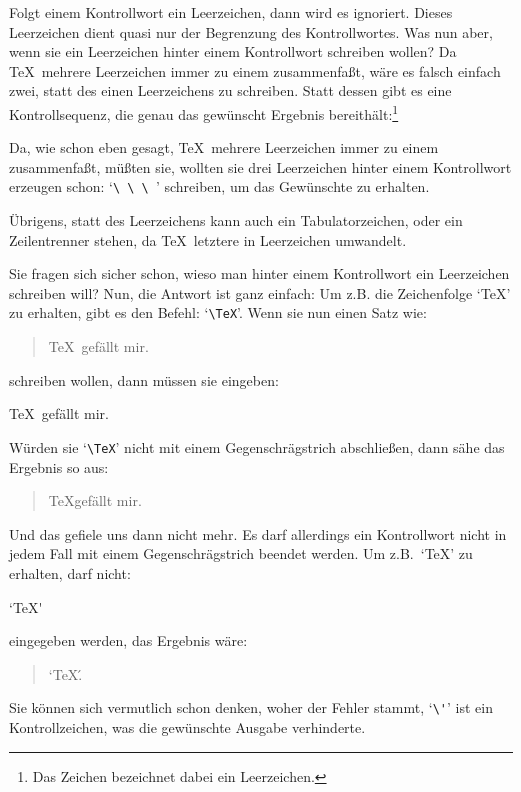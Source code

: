 Folgt einem Kontrollwort ein 
Leerzeichen, dann wird es ignoriert.
Dieses Leerzeichen dient quasi nur der Begrenzung des Kontrollwortes.
Was nun aber, wenn sie ein Leerzeichen hinter einem Kontrollwort
schreiben wollen? Da \TeX\ mehrere Leerzeichen immer zu einem
zusammenfa\ss{}t, w\"are es falsch einfach zwei, statt des einen
Leerzeichens zu schreiben. Statt dessen gibt es eine
Kontrollsequenz,
die genau das gew\"unscht Ergebnis bereith\"alt:\footnote{Das Zeichen {\tt{}}
bezeichnet dabei ein Leerzeichen.}
\begin{quote}
{\tt{}}
\end{quote}
Da, wie schon eben gesagt, \TeX\ mehrere Leerzeichen immer zu einem
zusammenfa\ss{}t, m\"u\ss{}ten sie, wollten sie drei Leerzeichen hinter einem
Kontrollwort erzeugen schon: `\verb*|\ \ \ |' schrei\-ben, um das
Gew\"unschte zu erhalten.

\"Ubrigens, statt des 
Leerzeichens kann auch ein Tabulatorzeichen, oder
ein Zeilentrenner stehen, da \TeX\ letztere in Leerzeichen umwandelt.

Sie fragen sich sicher schon, wieso man hinter einem Kontrollwort ein
Leerzeichen schrei\-ben will? Nun, die Antwort ist ganz einfach: Um z.B.
die Zeichenfolge `\TeX' zu erhalten, gibt es den Befehl:
`\verb|\TeX|'. Wenn sie nun einen Satz wie:
\begin{quote}
\TeX\ gef\"allt mir.
\end{quote}
schreiben wollen, dann m\"ussen sie eingeben:
\begin{verbatim*}
\TeX\ gef\"allt mir.
\end{verbatim*}
W\"urden sie `\verb|\TeX|' nicht mit einem
Gegenschr\"agstrich
abschlie\ss{}en, dann s\"ahe das Ergebnis so aus:
\begin{quote}
\TeX gef\"allt mir.
\end{quote}
Und das gefiele uns dann nicht mehr. Es darf allerdings ein
Kontrollwort nicht in jedem Fall mit einem
Gegenschr\"agstrich beendet
werden. Um z.B.\ `\TeX' zu erhalten, darf nicht:
\begin{verbatim*}
`\TeX\'
\end{verbatim*}
eingegeben werden, das Ergebnis w\"are:
\begin{quote}
`\TeX\'.
\end{quote}
Sie k\"onnen sich vermutlich schon denken, woher der
Fehler stammt,
`\verb|\'|' ist ein Kontroll\-zei\-chen, was die gew\"unschte
Ausgabe verhinderte.

